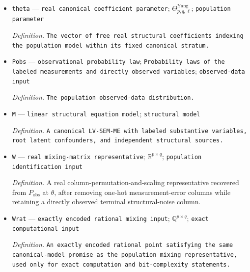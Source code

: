 \documentclass{article}
\begin{document}
\begin{itemize}
  \par\smallskip\noindent\emph{Definition.} \texttt{On each nonempty fixed canonical coefficient stratum,\allowbreak{} the relative Zariski-\allowbreak{}open subset obtained by deleting the proper algebraic exceptional loci in Yang et al.'s rank-\allowbreak{}generic recovery and faithfulness-\allowbreak{}preserving DOG argument;\allowbreak{} its complement has Lebesgue measure zero in the free coefficient coordinates of that stratum.}
  \item \texttt{theta} --- \texttt{real canonical coefficient parameter}; \(\Theta_{p,q,\ell}^{\mathrm{Yang}}\); \texttt{population parameter}
  \par\smallskip\noindent\emph{Definition.} \texttt{The vector of free real structural coefficients indexing the population model within its fixed canonical stratum.}
  \item \texttt{Pobs} --- \texttt{observational probability law}; \texttt{Probability laws of the labeled measurements and directly observed variables}; \texttt{observed-\allowbreak{}data input}
  \par\smallskip\noindent\emph{Definition.} \texttt{The population observed-\allowbreak{}data distribution.}
  \item \texttt{M} --- \texttt{linear structural equation model}; \texttt{structural model}
  \par\smallskip\noindent\emph{Definition.} \texttt{A canonical LV-\allowbreak{}SEM-\allowbreak{}ME with labeled substantive variables,\allowbreak{} root latent confounders,\allowbreak{} and independent structural sources.}
  \item \texttt{W} --- \texttt{real mixing-\allowbreak{}matrix representative}; \(\mathbb R^{p\times q}\); \texttt{population identification input}
  \par\smallskip\noindent\emph{Definition.} A real column-permutation-and-scaling representative recovered from \(P_{\mathrm{obs}}\) at \(\theta\), after removing one-hot measurement-error columns while retaining a directly observed terminal structural-noise column.
  \item \texttt{Wrat} --- \texttt{exactly encoded rational mixing input}; \(\mathbb Q^{p\times q}\); \texttt{exact computational input}
  \par\smallskip\noindent\emph{Definition.} \texttt{An exactly encoded rational point satisfying the same canonical-\allowbreak{}model promise as the population mixing representative,\allowbreak{} used only for exact computation and bit-\allowbreak{}complexity statements.}

\end{itemize}
\end{document}
